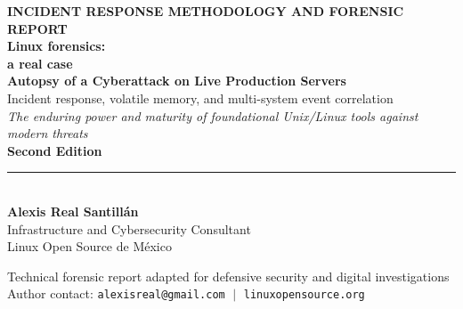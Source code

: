 \begin{titlepage}
\thispagestyle{empty}
\begin{center}
    \vspace*{1.2cm}

    {\fontsize{9}{12}\selectfont\sffamily\bfseries\color{secondary} INCIDENT RESPONSE METHODOLOGY AND FORENSIC REPORT}\\[0.8cm]

    {\fontsize{26}{30}\selectfont\sffamily\bfseries\color{primary} Linux forensics:}\\[0.3cm]
    {\fontsize{22}{26}\selectfont\sffamily\bfseries\color{primary} a real case}\\[0.8cm]

    {\large\textsf{\textbf{Autopsy of a Cyberattack on Live Production Servers}}}\\[0.4cm]
    {\normalsize\textsf{Incident response, volatile memory, and multi-system event correlation}}\\[0.8cm]

    {\small\textsf{\textit{The enduring power and maturity of foundational Unix/Linux tools against modern threats}}}\\[1.2cm]

    {\large\textsf{\textbf{Second Edition}}}\\[1.4cm]

    \rule{0.35\textwidth}{1.0pt}\\[1.6cm]

    {\Large\textbf{Alexis Real Santillán}}\\[0.4cm]
    {\large Infrastructure and Cybersecurity Consultant}\\[0.2cm]
    {\normalsize\textsf{Linux Open Source de México}}\\[2.2cm]

    \vfill

    {\small\textsf{Technical forensic report adapted for defensive security and digital investigations}}\\[0.2cm]
    {\footnotesize\textsf{Author contact: \texttt{alexisreal@gmail.com} $\;\vert\;$ \texttt{linuxopensource.org}}}

\end{center}
\end{titlepage}
